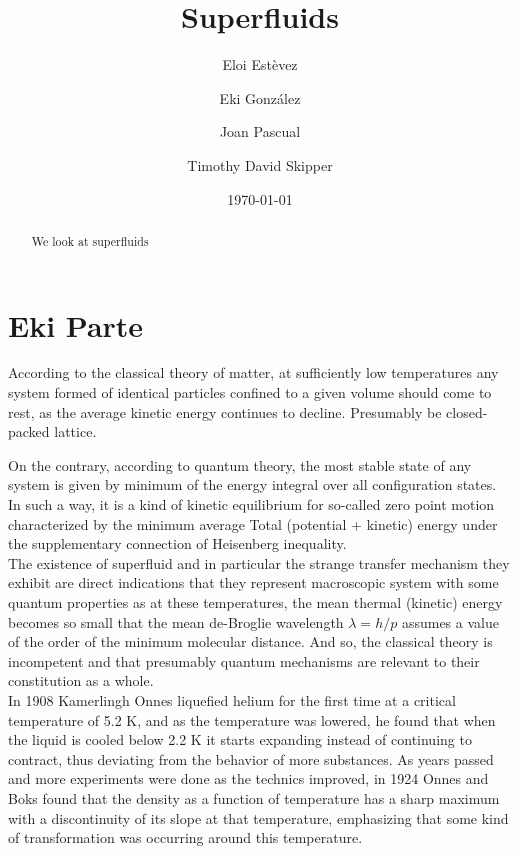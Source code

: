 \documentclass{article}
\title{Superfluids}
\author{Eloi Estèvez \and Eki González \and Joan Pascual \and Timothy David Skipper}
\date{\today}
\begin{document}
\maketitle
\begin{abstract}
We look at superfluids
\end{abstract}

\tableofcontents
\newpage

\section{Eki Parte}

According to the classical theory of matter, at sufficiently low temperatures any system formed of identical particles confined to a given volume should come to rest, as the average kinetic energy continues to decline. Presumably be closed-packed lattice.


On the contrary, according to quantum theory, the most stable state of any system is given by minimum of the energy integral over all configuration states. In such a way, it is a kind of kinetic equilibrium for so-called zero point motion characterized by the minimum average Total (potential + kinetic) energy under the supplementary connection of Heisenberg inequality.
\\

The existence of superfluid and in particular the strange transfer mechanism they exhibit are direct indications that they represent macroscopic system with some quantum properties as at these temperatures, the mean thermal (kinetic) energy becomes so small that the mean de-Broglie wavelength $\lambda = h/p$ assumes a value of the order of the minimum molecular distance. And so, the classical theory is incompetent and that presumably quantum mechanisms are relevant to their constitution as a whole.
\\

In 1908 Kamerlingh Onnes liquefied helium for the first time at a critical temperature of 5.2 K, and as the temperature was lowered, he found that when the liquid is cooled below 2.2 K it starts expanding instead of continuing to contract, thus deviating from the behavior of more substances.
As years passed and more experiments were done as the technics improved, in 1924 Onnes and Boks found that the density as a function of temperature has a sharp maximum with a discontinuity of its slope at that temperature, emphasizing that some kind of transformation was occurring around this temperature.
\\
\end{document}

